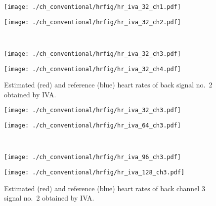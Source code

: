 \begin{figure}[htbp]
      \begin{minipage}[t]{0.45\hsize}
        \centering
        \texttt{[image: ./ch\_conventional/hrfig/hr\_iva\_32\_ch1.pdf]}
        \label{fig:hva32ch1}
      \end{minipage} 
      \begin{minipage}[t]{0.45\hsize}
        \centering
        \texttt{[image: ./ch\_conventional/hrfig/hr\_iva\_32\_ch2.pdf]}
        \label{fig:hva32ch2}
      \end{minipage} \\
      \begin{minipage}[t]{0.45\hsize}
        \centering
        \texttt{[image: ./ch\_conventional/hrfig/hr\_iva\_32\_ch3.pdf]}
        \label{fig:hva32ch3}
      \end{minipage} 
      \begin{minipage}[t]{0.45\hsize}
        \centering
        \texttt{[image: ./ch\_conventional/hrfig/hr\_iva\_32\_ch4.pdf]}
        \label{fig:hva32ch4}
      \end{minipage} 
     \caption{Estimated (red) and reference (blue) heart rates of back signal no.~2 obtained by IVA.}
     \label{fig:hrivach}
  \end{figure}

\begin{figure}[htbp]
      \begin{minipage}[t]{0.45\hsize}
        \centering
        \texttt{[image: ./ch\_conventional/hrfig/hr\_iva\_32\_ch3.pdf]}
        \label{fig:hva32ch3}
      \end{minipage} 
      \begin{minipage}[t]{0.45\hsize}
        \centering
        \texttt{[image: ./ch\_conventional/hrfig/hr\_iva\_64\_ch3.pdf]}
        \label{fig:hva64ch3}
      \end{minipage} \\
   
      \begin{minipage}[t]{0.45\hsize}
        \centering
        \texttt{[image: ./ch\_conventional/hrfig/hr\_iva\_96\_ch3.pdf]}
        \label{fig:hva96ch3}
      \end{minipage} 
      \begin{minipage}[t]{0.45\hsize}
        \centering
        \texttt{[image: ./ch\_conventional/hrfig/hr\_iva\_128\_ch3.pdf]}
        \label{fig:hva128ch3}
      \end{minipage} 
     \caption{Estimated (red) and reference (blue) heart rates of back channel 3 signal no.~2 obtained by IVA.}
     \label{fig:hrivafftsize}
  \end{figure}

